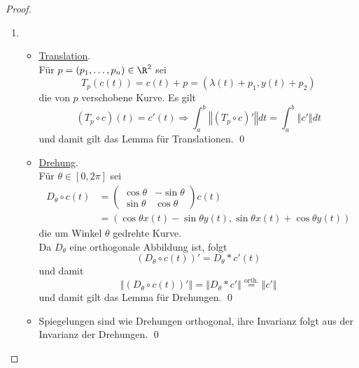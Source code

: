 \begin{lemma}
\begin{proof}
\begin{enumerate}
      \item \begin{itemize}
        \item \underline{Translation}. \\ Für \( p = (p_1, \dots, p_n) \in \R^2 \) sei
        \begin{equation*}
           T_p(c(t)) = c(t) + p = (\lambda(t) + p_1, y(t) + p_2)
         \end{equation*} 
         die von \( p \) verschobene Kurve. Es gilt
         \begin{equation*}
           (T_p \circ c)(t) = c'(t) \Rightarrow \int_a^b \left\Vert (T_p \circ c)' \right\Vert dt = \int_a^b \left\Vert c' \right\Vert dt
         \end{equation*}
         und damit gilt das Lemma für Translationen. \qed{}
        \item \underline{Drehung}. \\
        Für \( \theta \in [0,2\pi] \) sei
        \begin{align*}
          D_\theta \circ c(t) &= \begin{pmatrix}
            \cos\theta & -\sin\theta \\
            \sin\theta & \cos\theta
          \end{pmatrix}c(t) \\ 
           &= (\cos\theta x(t) - \sin\theta y(t), \sin\theta x(t) + \cos\theta y(t))
        \end{align*}
        die um Winkel \( \theta \) gedrehte Kurve. \\
        Da \( D_\theta \) eine orthogonale Abbildung ist, folgt
        \begin{equation*}
          (D_\theta \circ c(t))' = D_\theta * c'(t)
        \end{equation*}
        und damit
        \begin{equation*}
          \left\Vert (D_\theta \circ c(t))' \right\Vert = \left\Vert D_\theta * c' \right\Vert \overset{\text{orth.}}{=} \left\Vert c' \right\Vert
        \end{equation*}
        und damit gilt das Lemma für Drehungen. \qed{}
        \item Spiegelungen sind wie Drehungen orthogonal, ihre Invarianz folgt aus der Invarianz der Drehungen. \qed{}
      \end{itemize}
    \end{enumerate}
  \end{proof}
\end{lemma}

